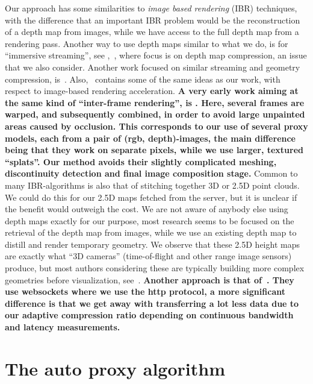 Our approach has some similarities to {\em image based rendering} (IBR)
techniques, with the difference that an important IBR problem would be the
reconstruction of a depth map from images, while we have access to the full
depth map from a rendering pass.  Another way to use depth maps similar to what
we do, is for ``immersive streaming'', see \eg,~\cite{ibr}, where focus is on
depth map compression, an issue that we also consider. Another work
focused on similar streaming and geometry compression,
is~\cite{teler}. Also,~\cite{220764} contains some of the same ideas as our
work, with respect to image-based rendering acceleration.
%
\textbf{A very early work aiming at the same kind of ``inter-frame rendering'', is
\cite{Mark:1997:PW:253284.253292}. Here, several frames are warped, and
subsequently combined, in order to avoid large unpainted areas caused by
occlusion. This corresponds to our use of several proxy models, each from a pair
of (rgb, depth)-images, the main difference being that they work on separate
pixels, while we use larger, textured ``splats''. Our method avoids their
slightly complicated meshing, discontinuity detection and final image
composition stage.}
%
Common to many IBR-algorithms is also that of stitching together 3D or 2.5D
point clouds. We could do this for our 2.5D maps fetched from the server, but it
is unclear if the benefit would outweigh the cost.
%
We are not aware of anybody else using depth maps exactly for our purpose, most
research seems to be focused on the retrieval of the depth map from images,
while we use an existing depth map to distill and render temporary geometry.
%
We observe that these 2.5D height maps are exactly what ``3D cameras''
(time-of-flight and other range image sensors) produce, but most authors
considering these are typically building more complex geometries before
visualization, see~\cite{IMM2009-05801}.
%
\textbf{Another approach is that of~\cite{altenhofen16rixels}. They use websockets
where we use the http protocol, a more significant difference is that we get
away with transferring a lot less data due to our adaptive compression ratio
depending on continuous bandwidth and latency measurements.
%
}







\section{The auto proxy algorithm}

